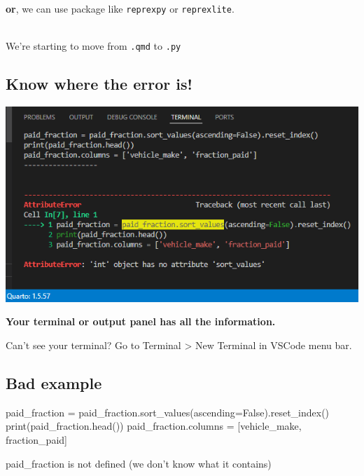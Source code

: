 \documentclass[
  letterpaper,
  DIV=11,
  numbers=noendperiod]{scrartcl}
\newenvironment{Shaded}{\begin{snugshade}}{\end{snugshade}}
\newcommand{\BuiltInTok}[1]{\textcolor[rgb]{0.00,0.23,0.31}{#1}}
\newcommand{\NormalTok}[1]{\textcolor[rgb]{0.00,0.23,0.31}{#1}}
\newcommand{\OperatorTok}[1]{\textcolor[rgb]{0.37,0.37,0.37}{#1}}
\newcommand{\StringTok}[1]{\textcolor[rgb]{0.13,0.47,0.30}{#1}}
\newcommand{\VariableTok}[1]{\textcolor[rgb]{0.07,0.07,0.07}{#1}}
\begin{document}
\textbf{or}, we can use package like \texttt{reprexpy} or
\texttt{reprexlite}.\\
\strut \\
We're starting to move from \texttt{.qmd} to \texttt{.py}

\subsection{Know where the error is!}\label{know-where-the-error-is}

\includegraphics{img/error.png}

\textbf{Your terminal or output panel has all the information.}

{ Can't see your terminal? Go to Terminal \textgreater{} New Terminal in
VSCode menu bar. }

\subsection{Bad example}\label{bad-example}

\begin{Shaded}
\begin{Highlighting}[]
\NormalTok{paid\_fraction }\OperatorTok{=}\NormalTok{ paid\_fraction.sort\_values(ascending}\OperatorTok{=}\VariableTok{False}\NormalTok{).reset\_index()}
\BuiltInTok{print}\NormalTok{(paid\_fraction.head())}
\NormalTok{paid\_fraction.columns }\OperatorTok{=}\NormalTok{ [}\StringTok{\textquotesingle{}vehicle\_make\textquotesingle{}}\NormalTok{, }\StringTok{\textquotesingle{}fraction\_paid\textquotesingle{}}\NormalTok{]}
\end{Highlighting}
\end{Shaded}

\hfill\break

paid\_fraction is not defined (we don't know what it contains)
\end{document}
